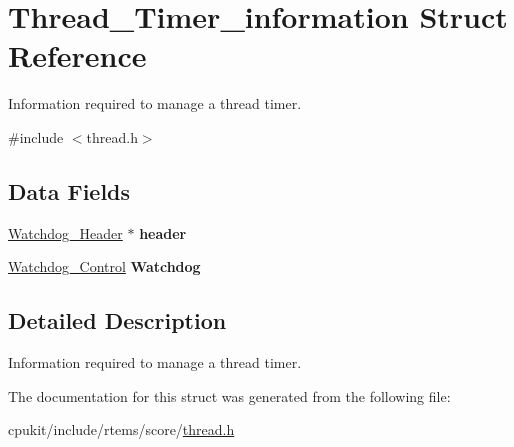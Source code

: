 \hypertarget{structThread__Timer__information}{}\section{Thread\+\_\+\+Timer\+\_\+information Struct Reference}
\label{structThread__Timer__information}


Information required to manage a thread timer.  




{\ttfamily \#include $<$thread.\+h$>$}

\subsection*{Data Fields}
\begin{DoxyCompactItemize}
\item 
\mbox{\label{structThread__Timer__information_a7ee64c2cf60f41ee142b0381d8c3ad42}} 
\mbox{\hyperlink{structWatchdog__Header}{Watchdog\+\_\+\+Header}} $\ast$ {\bfseries header}
\item 
\mbox{\label{structThread__Timer__information_a96774b4034d8b5a1e41df32d5cb3b7fa}} 
\mbox{\hyperlink{structWatchdog__Control}{Watchdog\+\_\+\+Control}} {\bfseries Watchdog}
\end{DoxyCompactItemize}


\subsection{Detailed Description}
Information required to manage a thread timer. 

The documentation for this struct was generated from the following file\+:\begin{DoxyCompactItemize}
\item 
cpukit/include/rtems/score/\mbox{\hyperlink{score_2thread_8h}{thread.\+h}}\end{DoxyCompactItemize}
